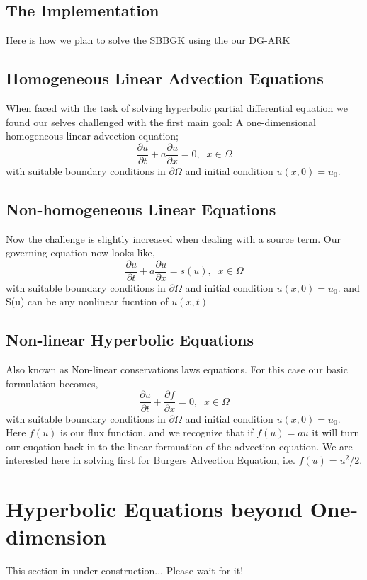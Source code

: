 \documentclass[11pt,fleqn]{report}
\begin{document}
\section{The Implementation}
Here is how we plan to solve the SBBGK using the our DG-ARK

\section{Homogeneous Linear Advection Equations}
When faced with the task of solving hyperbolic partial differential equation we found our selves challenged with the first main goal: A one-dimensional homogeneous linear advection equation;
\begin{equation}
	\frac{\partial u}{\partial t} + a \frac{\partial u}{\partial x} = 0, \;\; x \in \Omega
	\label{homo_advection}
\end{equation}
with suitable boundary conditions in $\partial \Omega$ and initial condition $u(x,0) = u_0$.



\section{Non-homogeneous Linear Equations}
Now the challenge is slightly increased when dealing with a source term. Our governing equation now looks like,
\begin{equation}
	\frac{\partial u}{\partial t} + a \frac{\partial u}{\partial x} = s(u), \;\; x \in \Omega
	\label{nonhomo_advection}
\end{equation}
with suitable boundary conditions in $\partial \Omega$ and initial condition $u(x,0) = u_0$.
and S(u) can be any nonlinear fucntion of $u(x,t)$

\section{Non-linear Hyperbolic Equations}
Also known as Non-linear conservations laws equations. For this case our basic formulation becomes,
\begin{equation}
	\frac{\partial u}{\partial t} + \frac{\partial f}{\partial x} = 0, \;\; x \in \Omega
	\label{nonlinear_advection}
\end{equation}
with suitable boundary conditions in $\partial \Omega$ and initial condition $u(x,0) = u_0$. 
Here $f(u)$ is our flux function, and we recognize that if $f(u) = a u$ it will turn our euqation back in to the linear formuation of the advection equation. We are interested here in solving first for Burgers Advection Equation, i.e. $f(u) = u^2/2$.

\chapter{Hyperbolic Equations beyond One-dimension}
This section in under construction... Please wait for it!
\end{document}
